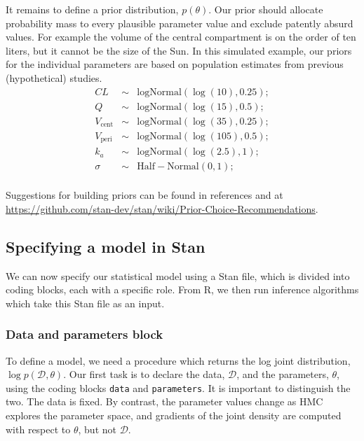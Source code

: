It remains to define a prior distribution, $p(\theta)$.
Our prior should allocate probability mass to every plausible parameter value and exclude patently absurd values.
For example the volume of the central compartment is on the order of ten liters, but it cannot be the size of the Sun.
In this simulated example, our priors for the individual parameters are based on population estimates from previous (hypothetical) studies.
\begin{eqnarray*}
  CL & \sim & \mathrm{logNormal}(\log(10), 0.25);  \\
  Q & \sim & \mathrm{logNormal}(\log(15), 0.5); \\
  V_\mathrm{cent} & \sim & \mathrm{logNormal}(\log(35), 0.25); \\
  V_\mathrm{peri} & \sim & \mathrm{logNormal}(\log(105), 0.5); \\
  k_a & \sim & \mathrm{logNormal}(\log(2.5), 1); \\
  \sigma & \sim & \mathrm{Half-Normal}(0, 1); \\
\end{eqnarray*}

Suggestions for building priors can be found in references \cite{Gabry:2019, Betancourt:2020} and at \url{https://github.com/stan-dev/stan/wiki/Prior-Choice-Recommendations}.

\subsection{Specifying a model in Stan}

We can now specify our statistical model using a Stan file, which is divided into coding blocks, each with a specific role.
From R, we then run inference algorithms which take this Stan file as an input.

\subsubsection{Data and parameters block}

To define a model, we need a procedure which returns the log joint distribution, $\log p(\mathcal D, \theta)$.
Our first task is to declare the data, $\mathcal D$, and the parameters, $\theta$, using the coding blocks \texttt{data} and \texttt{parameters}.
It is important to distinguish the two.
The data is fixed.
By contrast, the parameter values change as HMC explores the parameter space, and gradients of the joint density are computed with respect to $\theta$, but not $\mathcal D$.

